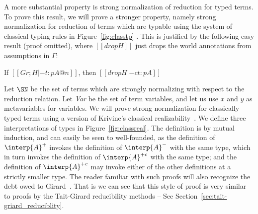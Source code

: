 A more substantial property is strong normalization of reduction for
typed terms.  To prove this result, we will prove a stronger property,
namely strong normalization for reduction of terms which are typable
using the system of classical typing rules in Figure~\ref{fig:classtp}
\cite{crolard01}.  This is justified by the following easy result
(proof omitted), where $[[drop H]]$ just drops the world annotations
from assumptions in $\Gamma$:
\begin{thm}
\label{thm:inttoclass}
If $[[Gr ; H |- t : p A @ n]]$, then $[[ drop H |-c t : p A]]$
\end{thm}

Let $\SN$ be the set of terms which are strongly normalizing with
respect to the reduction relation.  Let \textit{Var} be the set of
term variables, and let us use $x$ and $y$ as metavariables for
variables.  We will prove strong normalization for classically typed
terms using a version of Krivine's classical
realizability~\cite{krivine09}.  We define three interpretations of
types in Figure~\ref{fig:classreal}.  The definition is by mutual
induction, and can easily be seen to well-founded, as the definition
of $\interp{A}^+$ invokes the definition of $\interp{A}^-$ with the
same type, which in turn invokes the definition of $\interp{A}^{+c}$
with the same type; and the definition of $\interp{A}^{+c}$ may invoke
either of the other definitions at a strictly smaller type.  The
reader familiar with such proofs will also recognize the debt owed to
Girard~\cite{gtl90}.  That is we can see that this style of proof is
very similar to proofs by the Tait-Girard reducibility methods -- See
Section~\ref{sec:tait-griard_reduciblity}.

